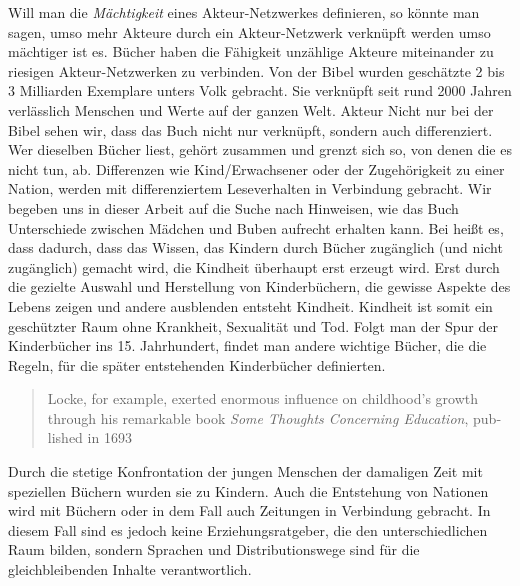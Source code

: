   Will man die \emph{Mächtigkeit} eines Akteur-Netzwerkes definieren, so könnte
  man sagen, umso mehr Akteure durch ein Akteur-Netzwerk verknüpft werden umso
  mächtiger ist es. Bücher haben die Fähigkeit unzählige Akteure miteinander zu
  riesigen Akteur-Netzwerken zu verbinden. Von der Bibel wurden \zB geschätzte 2
  bis 3 Milliarden Exemplare unters Volk gebracht. Sie verknüpft seit rund 2000
  Jahren verlässlich Menschen und Werte auf der ganzen Welt. %
  Akteur Nicht nur bei der Bibel sehen wir, dass das Buch nicht nur verknüpft,
  sondern auch differenziert. Wer dieselben Bücher liest, gehört zusammen und
  grenzt sich so, von denen die es nicht tun, ab. Differenzen wie
  Kind/Erwachsener oder der Zugehörigkeit zu einer Nation, werden mit
  differenziertem Leseverhalten in Verbindung gebracht.  \parencites[Kap.\,3
  in][]{Postman2011}[50]{McLuhan2012} Wir begeben uns in dieser Arbeit auf die
  Suche nach Hinweisen, wie das Buch Unterschiede zwischen Mädchen und Buben
  aufrecht erhalten kann. Bei  heißt es, dass dadurch,
  dass das Wissen, das Kindern durch Bücher zugänglich (und nicht zugänglich)
  gemacht wird, die Kindheit überhaupt erst erzeugt wird. Erst durch die
  gezielte Auswahl und Herstellung von Kinderbüchern, die gewisse Aspekte des
  Lebens zeigen und andere ausblenden entsteht Kindheit. Kindheit ist somit ein
  geschützter Raum ohne Krankheit, Sexualität und Tod. Folgt man der Spur der
  Kinderbücher ins 15. Jahrhundert, findet man andere wichtige Bücher, die die
  Regeln, für die später entstehenden Kinderbücher definierten.
  \hyphenblockcquote{english}[loc.\,963]{Postman2011}{Locke, for example,
  exerted enormous influence on childhood's growth through his remarkable book
  \emph{Some Thoughts Concerning Education}, published in 1693} Durch die
  stetige Konfrontation der jungen Menschen der damaligen Zeit mit speziellen
  Büchern wurden sie zu Kindern. Auch die Entstehung von Nationen wird mit
  Büchern oder in dem Fall auch Zeitungen in Verbindung gebracht. In diesem Fall
  sind es jedoch keine Erziehungsratgeber, die den unterschiedlichen Raum
  bilden, sondern Sprachen und Distributionswege sind für die gleichbleibenden
  Inhalte verantwortlich. \parencite[39]{Anderson2006}


